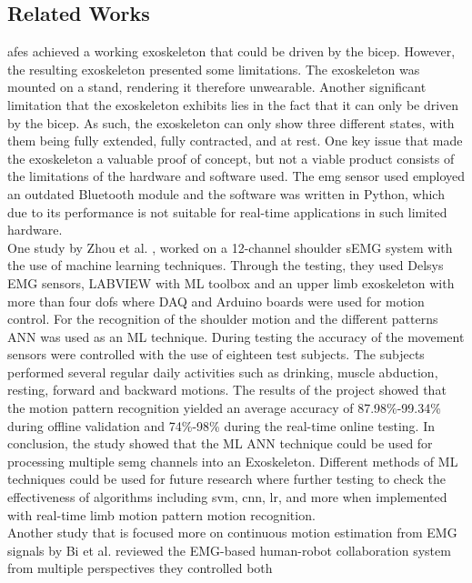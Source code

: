 \subsection{Related Works}
\acrshort{afes} \cite{AFES} achieved a working exoskeleton that could be driven by the bicep. However, the resulting 
exoskeleton presented some limitations. The exoskeleton was mounted on a stand, rendering it therefore unwearable. Another significant limitation 
that the exoskeleton exhibits lies in the fact that it can only be driven by the bicep. As such, the exoskeleton can only show three different states, 
with them being fully extended, fully contracted, and at rest. One key issue that made the exoskeleton a valuable proof of concept, but not a viable 
product consists of the limitations of the hardware and software used. The \acrshort{emg} sensor used employed an outdated Bluetooth module and the software was 
written in Python, which due to its performance is not suitable for real-time applications in such limited hardware. 
\\
One study by Zhou et al. \cite{shoulderexo}, worked on a 12-channel shoulder sEMG system with the use of machine learning techniques. Through the testing, they used Delsys EMG sensors, LABVIEW with ML toolbox and an 
upper limb exoskeleton with more than four \acp{dof} where DAQ and Arduino boards were used for motion control. For the recognition of the shoulder motion and the different patterns ANN was used as an 
ML technique. During testing the accuracy of the movement sensors were controlled with the use of eighteen test subjects. The subjects performed several regular daily activities
such as drinking, muscle abduction, resting, forward and backward motions. The results of the project showed that the motion pattern recognition yielded an average accuracy of 87.98\%-99.34\% 
during offline validation and 74\%-98\% during the real-time online testing. In conclusion, the study showed that the ML ANN technique could be used for processing multiple \acrshort{semg} channels
into an Exoskeleton. Different methods of ML techniques could be used for future research  where further testing to check the effectiveness of algorithms including \acrfull{svm},
\acrfull{cnn}, \acrfull{lr}, and more when implemented with real-time limb motion pattern motion recognition.
\\
Another study that is focused more on continuous motion estimation from EMG signals by Bi et al. \cite{continuousemg} reviewed the EMG-based human-robot collaboration system from multiple perspectives they controlled both 
